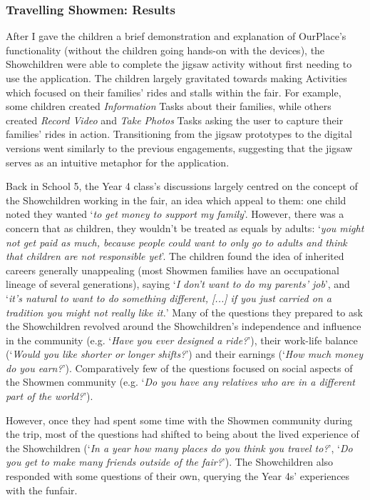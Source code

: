 \subsubsection{Travelling Showmen: Results}

After I gave the children a brief demonstration and explanation of OurPlace's functionality (without the children going hands-on with the devices), the Showchildren were able to complete the jigsaw activity without first needing to use the application. The children largely gravitated towards making Activities which focused on their families' rides and stalls within the fair. For example, some children created \textit{Information} Tasks about their families, while others created \textit{Record Video} and \textit{Take Photos} Tasks asking the user to capture their families' rides in action. Transitioning from the jigsaw prototypes to the digital versions went similarly to the previous engagements, suggesting that the jigsaw serves as an intuitive metaphor for the application. 

Back in School 5, the Year 4 class's discussions largely centred on the concept of the Showchildren working in the fair, an idea which appeal to them: one child noted they wanted `\textit{to get money to support my family}'. However, there was a concern that as children, they wouldn't be treated as equals by adults: `\textit{you might not get paid as much, because people could want to only go to adults and think that children are not responsible yet}'. The children found the idea of inherited careers generally unappealing (most Showmen families have an occupational lineage of several generations), saying `\textit{I don't want to do my parents' job}', and `\textit{it's natural to want to do something different, [...] if you just carried on a tradition you might not really like it.}' Many of the questions they prepared to ask the Showchildren revolved around the Showchildren's independence and influence in the community (e.g. `\textit{Have you ever designed a ride?}'), their work-life balance (`\textit{Would you like shorter or longer shifts?}') and their earnings (`\textit{How much money do you earn?}'). Comparatively few of the questions focused on social aspects of the Showmen community (e.g. `\textit{Do you have any relatives who are in a different part of the world?}').

However, once they had spent some time with the Showmen community during the trip, most of the questions had shifted to being about the lived experience of the Showchildren (`\textit{In a year how many places do you think you travel to?}', `\textit{Do you get to make many friends outside of the fair?}'). The Showchildren also responded with some questions of their own, querying the Year 4s' experiences with the funfair.


